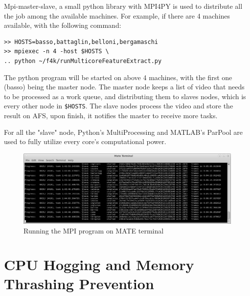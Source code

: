 \documentclass[bsc,logo,twoside,fullspacing,parskip]{infthesis}
\begin{document}
Mpi-master-slave\cite{L5}, a small python library with MPI4PY is used to distribute all the job among the available machines. 
For example, if there are 4 machines available, with the following command: 
\lstset{basicstyle=\footnotesize\ttfamily,breaklines=true}
\begin{lstlisting}[frame=single]
>> HOSTS=basso,battaglin,belloni,bergamaschi
>> mpiexec -n 4 -host $HOSTS \
.. python ~/f4k/runMulticoreFeatureExtract.py
\end{lstlisting}
The python program will be started on above 4 machines, with the first one (basso) being the master node.
The master node keeps a list of video that needs to be processed as a work queue, and distributing them to slaves nodes, which is every other node in {\tt \$HOSTS}. 
The slave nodes process the video and store the result on AFS, upon finish, it notifies the master to receive more tasks.


For all the "slave" node, Python's MultiProcessing and MATLAB's ParPool are used to fully utilize every core's computational power.

\begin{figure}
    \centering
    \includegraphics[scale=0.30]{graph/sample_terminal.png}
    \caption{Running the MPI program on MATE terminal}
    \label{fig:mpi}
\end{figure}

\section{CPU Hogging and Memory Thrashing Prevention}
\end{document}
